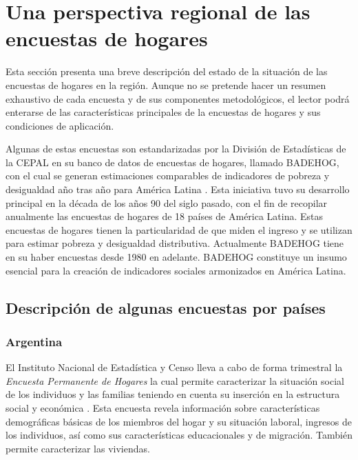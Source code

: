 \documentclass[
  12pt,
]{book}
\begin{document}
\hypertarget{appendix-appendix}{%
\appendix}


\hypertarget{una-perspectiva-regional-de-las-encuestas-de-hogares}{%
\chapter{Una perspectiva regional de las encuestas de hogares}\label{una-perspectiva-regional-de-las-encuestas-de-hogares}}

Esta sección presenta una breve descripción del estado de la situación de las encuestas de hogares en la región. Aunque no se pretende hacer un resumen exhaustivo de cada encuesta y de sus componentes metodológicos, el lector podrá enterarse de las características principales de la encuestas de hogares y sus condiciones de aplicación.

Algunas de estas encuestas son estandarizadas por la División de Estadísticas de la CEPAL en su banco de datos de encuestas de hogares, llamado BADEHOG, con el cual se generan estimaciones comparables de indicadores de pobreza y desigualdad año tras año para América Latina \citep{BADEHOG}. Esta iniciativa tuvo su desarrollo principal en la década de los años 90 del siglo pasado, con el fin de recopilar anualmente las encuestas de hogares de 18 países de América Latina. Estas encuestas de hogares tienen la particularidad de que miden el ingreso y se utilizan para estimar pobreza y desigualdad distributiva. Actualmente BADEHOG tiene en su haber encuestas desde 1980 en adelante. BADEHOG constituye un insumo esencial para la creación de indicadores sociales armonizados en América Latina.

\hypertarget{descripciuxf3n-de-algunas-encuestas-por-pauxedses}{%
\section{Descripción de algunas encuestas por países}\label{descripciuxf3n-de-algunas-encuestas-por-pauxedses}}

\hypertarget{argentina}{%
\subsection{Argentina}\label{argentina}}

El Instituto Nacional de Estadística y Censo lleva a cabo de forma trimestral la \emph{Encuesta Permanente de Hogares} la cual permite caracterizar la situación social de los individuos y las familias teniendo en cuenta su inserción en la estructura social y económica \citep{INDEC-AR}. Esta encuesta revela información sobre características demográficas básicas de los miembros del hogar y su situación laboral, ingresos de los individuos, así como sus características educacionales y de migración. También permite caracterizar las viviendas.
\end{document}
